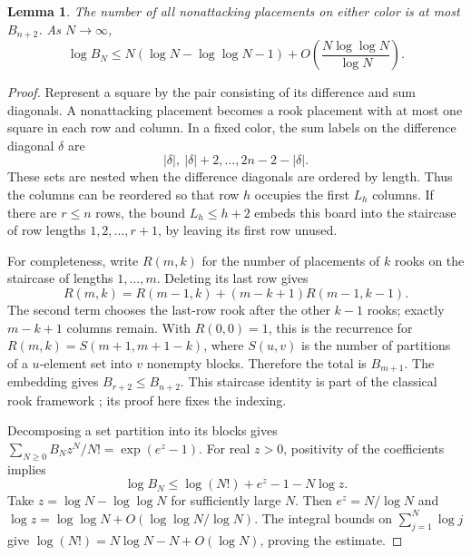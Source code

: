 \documentclass[11pt]{article}
\newtheorem{lemma}[theorem]{Lemma}
\begin{document}
\begin{lemma}\label{lem:bell}
The number of all nonattacking placements on either color is at most
$B_{n+2}$. As $N\to\infty$,
\[
 \log B_N\leq N(\log N-\log\log N-1)
       +O\!\left(\frac{N\log\log N}{\log N}\right).
\]
\end{lemma}
\begin{proof}
Represent a square by the pair consisting of its difference and sum
diagonals. A nonattacking placement becomes a rook placement with at
most one square in each row and column. In a fixed color, the sum labels
on the difference diagonal $\delta$ are
\[
 |\delta|,\ |\delta|+2,\ldots,2n-2-|\delta|.
\]
These sets are nested when the difference diagonals are ordered by
length. Thus the columns can be reordered so that row $h$ occupies the
first $L_h$ columns. If there are $r\leq n$ rows, the bound
$L_h\leq h+2$ embeds this board into the staircase of row lengths
$1,2,\ldots,r+1$, by leaving its first row unused.

For completeness, write $R(m,k)$ for the number of placements of $k$
rooks on the staircase of lengths $1,\ldots,m$.
Deleting its last row gives
\[
 R(m,k)=R(m-1,k)+(m-k+1)R(m-1,k-1).
\]
The second term chooses the last-row rook after the other $k-1$ rooks;
exactly $m-k+1$ columns remain. With $R(0,0)=1$, this is the recurrence
for $R(m,k)=S(m+1,m+1-k)$, where $S(u,v)$ is the number of partitions
of a $u$-element set into $v$ nonempty blocks. Therefore the total is
$B_{m+1}$. The embedding gives $B_{r+2}\leq B_{n+2}$.
This staircase identity is part of the classical rook framework
\cite{kaplansky}; its proof here fixes the indexing.

Decomposing a set partition into its blocks gives
$\sum_{N\geq0}B_Nz^N/N!=\exp(e^z-1)$.
For real $z>0$, positivity of the coefficients implies
\[
 \log B_N\leq\log(N!)+e^z-1-N\log z.
\]
Take $z=\log N-\log\log N$ for sufficiently large $N$.
Then $e^z=N/\log N$ and
$\log z=\log\log N+O(\log\log N/\log N)$.
The integral bounds on $\sum_{j=1}^N\log j$ give
$\log(N!)=N\log N-N+O(\log N)$, proving the estimate.
\end{proof}
\end{document}
